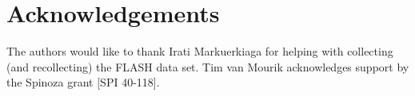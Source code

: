 \section*{Acknowledgements}
The authors would like to thank Irati Markuerkiaga for helping with collecting (and recollecting) the FLASH data set. Tim van Mourik acknowledges support by the Spinoza grant [SPI 40-118].
